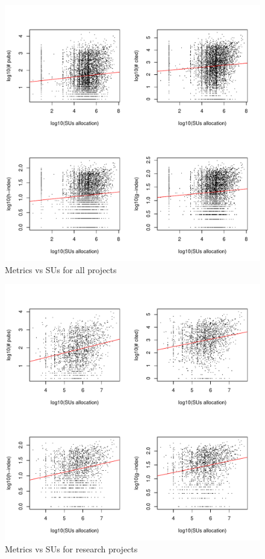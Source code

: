 \begin{figure}[htb]
  \centering
    \includegraphics[width=1.0\columnwidth]{images/02_metrics_vs_alloc_proj.pdf}
  \caption{Metrics vs SUs for all projects}\label{F:metrics-vs-alloc-proj}
\end{figure}

\begin{figure}[htb]
  \centering
    \includegraphics[width=1.0\columnwidth]{images/02_metrics_vs_alloc_research_proj.pdf}
  \caption{Metrics vs SUs for research projects}\label{F:metrics-vs-alloc-research-proj}
\end{figure}

